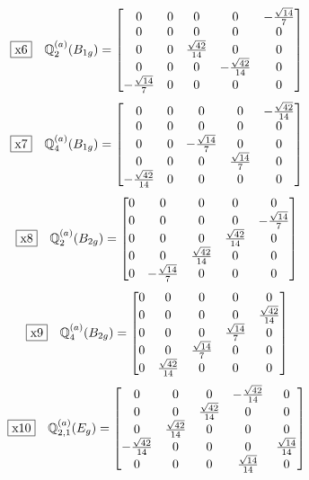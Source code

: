 \documentclass[fleqn,10pt,landscape]{jsarticle}
\begin{document}
\begin{dmath*}
\fbox{x6}\quad \mathbb{Q}_{2}^{(a)}(B_{1g})=\begin{bmatrix} 0 & 0 & 0 & 0 & - \frac{\sqrt{14}}{7} \\ 0 & 0 & 0 & 0 & 0 \\ 0 & 0 & \frac{\sqrt{42}}{14} & 0 & 0 \\ 0 & 0 & 0 & - \frac{\sqrt{42}}{14} & 0 \\ - \frac{\sqrt{14}}{7} & 0 & 0 & 0 & 0 \end{bmatrix}
\end{dmath*}
\begin{dmath*}
\fbox{x7}\quad \mathbb{Q}_{4}^{(a)}(B_{1g})=\begin{bmatrix} 0 & 0 & 0 & 0 & - \frac{\sqrt{42}}{14} \\ 0 & 0 & 0 & 0 & 0 \\ 0 & 0 & - \frac{\sqrt{14}}{7} & 0 & 0 \\ 0 & 0 & 0 & \frac{\sqrt{14}}{7} & 0 \\ - \frac{\sqrt{42}}{14} & 0 & 0 & 0 & 0 \end{bmatrix}
\end{dmath*}
\begin{dmath*}
\fbox{x8}\quad \mathbb{Q}_{2}^{(a)}(B_{2g})=\begin{bmatrix} 0 & 0 & 0 & 0 & 0 \\ 0 & 0 & 0 & 0 & - \frac{\sqrt{14}}{7} \\ 0 & 0 & 0 & \frac{\sqrt{42}}{14} & 0 \\ 0 & 0 & \frac{\sqrt{42}}{14} & 0 & 0 \\ 0 & - \frac{\sqrt{14}}{7} & 0 & 0 & 0 \end{bmatrix}
\end{dmath*}
\begin{dmath*}
\fbox{x9}\quad \mathbb{Q}_{4}^{(a)}(B_{2g})=\begin{bmatrix} 0 & 0 & 0 & 0 & 0 \\ 0 & 0 & 0 & 0 & \frac{\sqrt{42}}{14} \\ 0 & 0 & 0 & \frac{\sqrt{14}}{7} & 0 \\ 0 & 0 & \frac{\sqrt{14}}{7} & 0 & 0 \\ 0 & \frac{\sqrt{42}}{14} & 0 & 0 & 0 \end{bmatrix}
\end{dmath*}
\begin{dmath*}
\fbox{x10}\quad \mathbb{Q}_{2,1}^{(a)}(E_{g})=\begin{bmatrix} 0 & 0 & 0 & - \frac{\sqrt{42}}{14} & 0 \\ 0 & 0 & \frac{\sqrt{42}}{14} & 0 & 0 \\ 0 & \frac{\sqrt{42}}{14} & 0 & 0 & 0 \\ - \frac{\sqrt{42}}{14} & 0 & 0 & 0 & \frac{\sqrt{14}}{14} \\ 0 & 0 & 0 & \frac{\sqrt{14}}{14} & 0 \end{bmatrix}
\end{dmath*}
\end{document}
